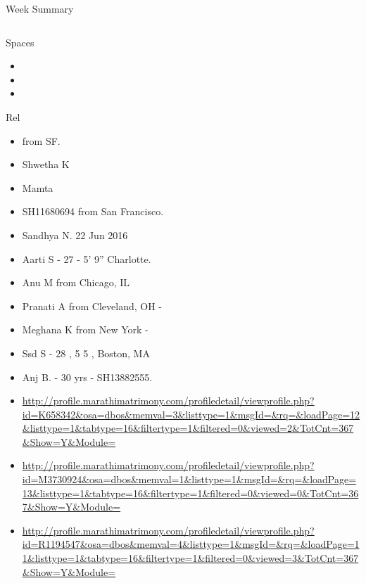 \documentclass[serif, mathserif, final]{beamer}
\begin{document}
\begin{frame}
\begin{columns}
\begin{column}{0.5\linewidth}
\begin{block}{Week Summary}
\begin{column}{0.25\linewidth}
\begin{block}{Spaces}
\begin{itemize} 
\tiny \item \tiny 
\item \tiny 
\item \tiny 
\end{itemize} 
\end{block} 

\begin{block}{Rel} 
  \begin{itemize} 
    \small \item \small  from SF. 
    \item \small Shwetha K 
    \item \small Mamta       
    \item \small SH11680694 from San Francisco. 
    \item \small Sandhya N. 22 Jun 2016 
    \item \small Aarti S - 27 - 5' 9'' Charlotte.       
    \item \small Anu M from Chicago, IL 
    \item \small Pranati A from Cleveland, OH - 
    \item \small Meghana K from New York - 
    \item \small Ssd S - 28 , 5 5 , Boston, MA 
    \item \small Anj B. - 30 yrs - SH13882555.
  \end{itemize} 


\begin{itemize}
\item \small
  \url{http://profile.marathimatrimony.com/profiledetail/viewprofile.php?id=K658342&osa=dbos&memval=3&listtype=1&msgId=&rq=&loadPage=12&listtype=1&tabtype=16&filtertype=1&filtered=0&viewed=2&TotCnt=367&Show=Y&Module=} 
\item \small \url{http://profile.marathimatrimony.com/profiledetail/viewprofile.php?id=M3730924&osa=dbos&memval=1&listtype=1&msgId=&rq=&loadPage=13&listtype=1&tabtype=16&filtertype=1&filtered=0&viewed=0&TotCnt=367&Show=Y&Module=}
  
\item \small \url{http://profile.marathimatrimony.com/profiledetail/viewprofile.php?id=R1194547&osa=dbos&memval=4&listtype=1&msgId=&rq=&loadPage=11&listtype=1&tabtype=16&filtertype=1&filtered=0&viewed=3&TotCnt=367&Show=Y&Module=}
  

\end{itemize}
\end{block}
\end{column}
\end{block}
\end{column}
\end{columns}
\end{frame}
\end{document}
